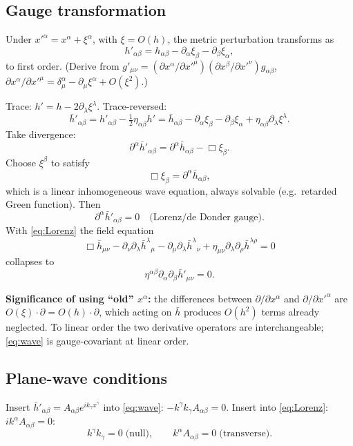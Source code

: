 \documentclass[11pt]{article}
\begin{document}
\subsection*{Gauge transformation}

Under $x'^{\alpha}=x^{\alpha}+\xi^{\alpha}$, with $\xi=O(h)$, the metric perturbation transforms as
\[ \boxed{\;h'_{\alpha\beta} = h_{\alpha\beta} - \partial_{\alpha}\xi_{\beta} - \partial_{\beta}\xi_{\alpha},\;} \]
to first order. (Derive from $g'_{\mu\nu}=(\partial x^{\alpha}/\partial x'^{\mu})(\partial x^{\beta}/\partial x'^{\nu})g_{\alpha\beta}$, $\partial x^{\alpha}/\partial x'^{\mu}=\delta^{\alpha}_{\mu}-\partial_{\mu}\xi^{\alpha}+O(\xi^{2})$.)

Trace: $h'=h-2\partial_{\lambda}\xi^{\lambda}$. Trace-reversed:
\[ \bar h'_{\alpha\beta} = h'_{\alpha\beta} - \tfrac12\eta_{\alpha\beta}h' = \bar h_{\alpha\beta} - \partial_{\alpha}\xi_{\beta} - \partial_{\beta}\xi_{\alpha} + \eta_{\alpha\beta}\partial_{\lambda}\xi^{\lambda}. \]
Take divergence:
\[ \partial^{\alpha}\bar h'_{\alpha\beta} = \partial^{\alpha}\bar h_{\alpha\beta} - \Box\xi_{\beta}. \]
Choose $\xi^{\beta}$ to satisfy
\[ \Box\xi_{\beta} = \partial^{\alpha}\bar h_{\alpha\beta}, \]
which is a linear inhomogeneous wave equation, always solvable (e.g.\ retarded Green function). Then
\[ \boxed{\;\partial^{\alpha}\bar h'_{\alpha\beta} = 0\quad\text{(Lorenz/de~Donder gauge).}\;}\label{eq:Lorenz} \]
With \eqref{eq:Lorenz} the field equation
\[ \Box\bar h_{\mu\nu} - \partial_{\nu}\partial_{\lambda}\bar h^{\lambda}{}_{\mu}-\partial_{\mu}\partial_{\lambda}\bar h^{\lambda}{}_{\nu}+\eta_{\mu\nu}\partial_{\lambda}\partial_{\rho}\bar h^{\lambda\rho}=0 \]
collapses to
\[ \boxed{\;\eta^{\alpha\beta}\partial_{\alpha}\partial_{\beta}\bar h'_{\mu\nu} = 0.\;}\label{eq:wave} \]

\textbf{Significance of using ``old'' $x^{\alpha}$:} the differences between $\partial/\partial x^{\alpha}$ and $\partial/\partial x'^{\alpha}$ are $O(\xi)\cdot\partial=O(h)\cdot\partial$, which acting on $\bar h$ produces $O(h^{2})$ terms already neglected. To linear order the two derivative operators are interchangeable; \eqref{eq:wave} is gauge-covariant at linear order.

\subsection*{Plane-wave conditions}

Insert $\bar h'_{\alpha\beta}=A_{\alpha\beta}e^{ik_{\gamma}x^{\gamma}}$ into \eqref{eq:wave}: $-k^{\gamma}k_{\gamma}A_{\alpha\beta}=0$. Insert into \eqref{eq:Lorenz}: $ik^{\alpha}A_{\alpha\beta}=0$:
\[ \boxed{\;k^{\gamma}k_{\gamma}=0\;\text{(null)},\qquad k^{\alpha}A_{\alpha\beta}=0\;\text{(transverse)}.\;}\label{eq:plane} \]
\end{document}
